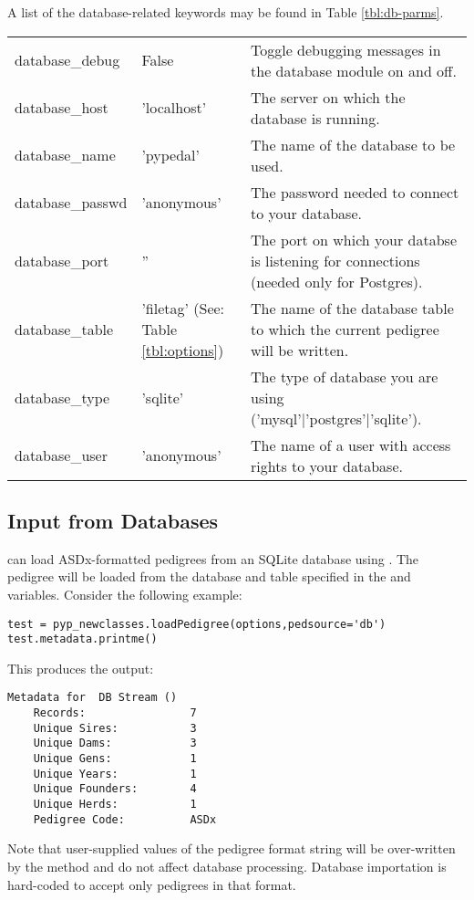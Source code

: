 A list of the database-related keywords may be found in Table \ref{tbl:db-parms}.
\begin{center}
    \tablelasttail{\hline}
    \label{tbl:db-parms}
    \begin{xtabular}{l|p{1in}|p{3in}}
    database\_debug & False & Toggle debugging messages in the database module on and off. \\
    database\_host & 'localhost' & The server on which the database is running. \\
    database\_name & 'pypedal' & The name of the database to be used. \\
    database\_passwd & 'anonymous' & The password needed to connect to your database. \\
    database\_port & '' & The port on which your databse is listening for connections (needed only for Postgres). \\
    database\_table & 'filetag' (See: Table \ref{tbl:options}) & The name of the database table to which the current pedigree will be written. \\
    database\_type & 'sqlite' & The type of database you are using ('mysql'|'postgres'|'sqlite'). \\
    database\_user & 'anonymous' & The name of a user with access rights to your database.  \\
    \end{xtabular}
\end{center}

\subsection{Input from Databases}\label{sec:io-input-database}
\PyPedal{} can load ASDx-formatted pedigrees from an SQLite database using . The pedigree will be loaded from the database and table specified in the  and  variables. Consider the following example:
\begin{verbatim}
test = pyp_newclasses.loadPedigree(options,pedsource='db')
test.metadata.printme()
\end{verbatim}
This produces the output:
\begin{verbatim}
Metadata for  DB Stream ()
    Records:                7
    Unique Sires:           3
    Unique Dams:            3
    Unique Gens:            1
    Unique Years:           1
    Unique Founders:        4
    Unique Herds:           1
    Pedigree Code:          ASDx
\end{verbatim}
Note that user-supplied values of the pedigree format string will be over-written by the  method and do not affect database processing. Database importation is hard-coded to accept only pedigrees in that format.

